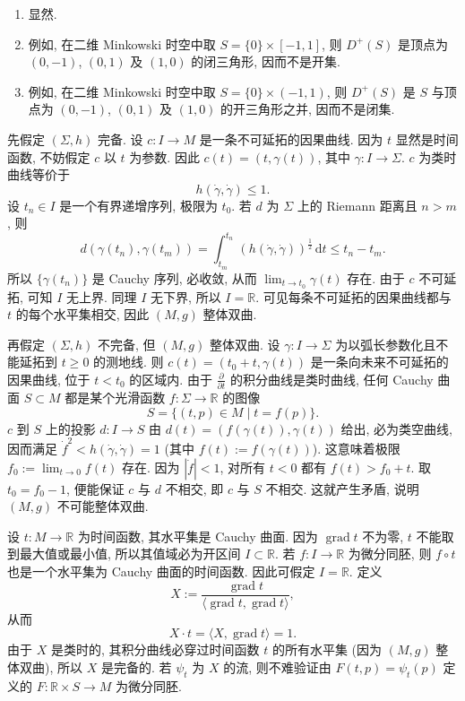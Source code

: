 \begin{description}[font=\normalfont,leftmargin=2em,labelwidth=1.5em]
\begin{enumerate}[label=(\alph*),ref=\alph*,leftmargin=*]
\item 显然.
\item 例如, 在二维 Minkowski 时空中取 $S=\{0\}\times[-1,1]$, 则 $D^+(S)$ 是顶点为 $(0,-1)$, $(0,1)$ 及 $(1,0)$ 的闭三角形, 因而不是开集.
\item 例如, 在二维 Minkowski 时空中取 $S=\{0\}\times(-1,1)$, 则 $D^+(S)$ 是 $S$ 与顶点为 $(0,-1)$, $(0,1)$ 及 $(1,0)$ 的开三角形之并, 因而不是闭集.
\end{enumerate}

先假定 $(\Sigma,h)$ 完备. 设 $c:I\to M$ 是一条不可延拓的因果曲线. 因为 $t$ 显然是时间函数, 不妨假定 $c$ 以 $t$ 为参数. 因此 $c(t)=(t,\gamma(t))$, 其中 $\gamma:I\to\Sigma$. $c$ 为类时曲线等价于
\[
  h(\dot\gamma,\dot\gamma)\leq1.
\]
设 $t_n\in I$ 是一个有界递增序列, 极限为 $t_0$. 若 $d$ 为 $\Sigma$ 上的 Riemann 距离且 $n>m$, 则
\[
  d(\gamma(t_n),\gamma(t_m))=\int_{t_m}^{t_n}(h(\dot\gamma,\dot\gamma))^{\frac{1}{2}}\,\mathrm{d}t
     \leq t_n-t_m.
\]
所以 $\{\gamma(t_n)\}$ 是 Cauchy 序列, 必收敛, 从而 $\lim_{t\to t_0}\gamma(t)$ 存在. 由于 $c$ 不可延拓, 可知 $I$ 无上界. 同理 $I$ 无下界, 所以 $I=\mathbb{R}$. 可见每条不可延拓的因果曲线都与 $t$ 的每个水平集相交, 因此 $(M,g)$ 整体双曲.

再假定 $(\Sigma,h)$ 不完备, 但 $(M,g)$ 整体双曲. 设 $\gamma:I\to\Sigma$ 为以弧长参数化且不能延拓到 $t\geq0$ 的测地线. 则 $c(t)=(t_0+t,\gamma(t))$ 是一条向未来不可延拓的因果曲线, 位于 $t<t_0$ 的区域内. 由于 $\frac{\partial}{\partial t}$ 的积分曲线是类时曲线, 任何 Cauchy 曲面 $S\subset M$ 都是某个光滑函数 $f:\Sigma\to\mathbb{R}$ 的图像
\[
  S=\{(t,p)\in M\mid t=f(p)\}.
\]
$c$ 到 $S$ 上的投影 $d:I\to S$ 由 $d(t)=(f(\gamma(t)),\gamma(t))$ 给出, 必为类空曲线, 因而满足 $\dot f^2<h(\dot\gamma,\dot\gamma)=1$ (其中 $f(t):=f(\gamma(t))$). 这意味着极限 $f_0:=\lim_{t\to0}f(t)$ 存在. 因为 $|\dot f|<1$, 对所有 $t<0$ 都有 $f(t)>f_0+t$. 取 $t_0=f_0-1$, 便能保证 $c$ 与 $d$ 不相交, 即 $c$ 与 $S$ 不相交. 这就产生矛盾, 说明 $(M,g)$ 不可能整体双曲.

设 $t:M\to\mathbb{R}$ 为时间函数, 其水平集是 Cauchy 曲面. 因为 $\operatorname{grad}t$ 不为零, $t$ 不能取到最大值或最小值, 所以其值域必为开区间 $I\subset\mathbb{R}$. 若 $f:I\to\mathbb{R}$ 为微分同胚, 则 $f\circ t$ 也是一个水平集为 Cauchy 曲面的时间函数. 因此可假定 $I=\mathbb{R}$. 定义
\[
  X:=\frac{\operatorname{grad}t}{\langle\operatorname{grad}t,\operatorname{grad}t\rangle},
\]
从而
\[
  X\cdot t=\langle X,\operatorname{grad}t\rangle=1.
\]
由于 $X$ 是类时的, 其积分曲线必穿过时间函数 $t$ 的所有水平集 (因为 $(M,g)$ 整体双曲), 所以 $X$ 是完备的. 若 $\psi_t$ 为 $X$ 的流, 则不难验证由 $F(t,p)=\psi_t(p)$ 定义的 $F:\mathbb{R}\times S\to M$ 为微分同胚.
\end{description}
